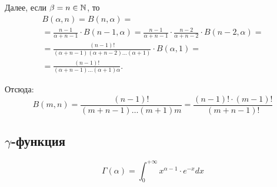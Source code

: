 \begin{enumerate}
\begin{note}
              Далее, если $ \beta = n \in \mathbb{N} $, то
              \begin{multline*}
                  B(\alpha,n) = B(n,\alpha) = \\
                  = \frac{n-1}{\alpha + n-1} \cdot B(n-1,\alpha) = \frac{n-1}{\alpha + n -1} \cdot \frac{n-2}{\alpha + n - 2} \cdot B(n-2,\alpha) = \\
                  = \frac{(n-1)!}{(\alpha+n-1)(\alpha + n -2)\ldots(\alpha +1)} \cdot B(\alpha,1) = \\
                  = \frac{(n-1)!}{(\alpha + n-1)\ldots(\alpha + 1)\alpha}.
              \end{multline*}

              Отсюда:
              \[
                  \boxed{B(m,n) = \frac{(n-1)!}{(m+n-1)\ldots(m+1)m} = \frac{(n-1)!\cdot(m-1)!}{(m+n-1)!}}
              \]
          \end{note}
\end{enumerate}

\subsection{$ \gamma $-функция}

\[
    \boxed{\Gamma(\alpha) = \int_{0}^{+\infty}x^{\alpha-1} \cdot e^{-x} dx}
\]

